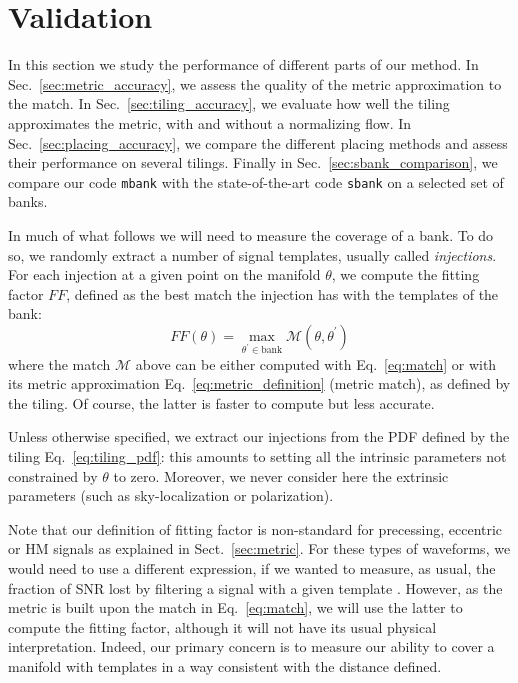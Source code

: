 \documentclass[twocolumn,showpacs,preprintnumbers,nofootinbib,prd,
superscriptaddress,10pt]{revtex4-2}
\begin{document}
\section{Validation} \label{sec:validation}

In this section we study the performance of different parts of our method. In Sec.~\ref{sec:metric_accuracy}, we assess the quality of the metric approximation to the match. In Sec.~\ref{sec:tiling_accuracy}, we evaluate how well the tiling approximates the metric, with and without a normalizing flow.
In Sec.~\ref{sec:placing_accuracy}, we compare the different placing methods and assess their performance on several tilings.
Finally in Sec.~\ref{sec:sbank_comparison}, we compare our code \texttt{mbank} with the state-of-the-art code \texttt{sbank} \cite{Ajith:2012mn} on a selected set of banks.

In much of what follows we will need to measure the coverage of a bank. To do so, we randomly extract a number of signal templates, usually called {\it injections}.
For each injection at a given point on the manifold $\theta$, we compute the fitting factor $FF$, defined as the best match the injection has with the templates of the bank:
\begin{equation}\label{eq:FF}
	FF(\theta) = \max_{\theta^\prime \in \text{bank}} \mathcal{M}(\theta, \theta^\prime)
\end{equation}
where the match $\mathcal{M}$ above can be either computed with Eq.~\eqref{eq:match} or with its metric approximation Eq.~\eqref{eq:metric_definition} (metric match), as defined by the tiling.
Of course, the latter is faster to compute but less accurate.

Unless otherwise specified, we extract our injections from the PDF defined by the tiling Eq.~\eqref{eq:tiling_pdf}: this amounts to setting all the intrinsic parameters not constrained by $\theta$ to zero.
Moreover, we never consider here the extrinsic parameters (such as sky-localization or polarization).

Note that our definition of fitting factor is non-standard for precessing, eccentric or HM signals as explained in Sect.~\ref{sec:metric}. For these types of waveforms, we would need to use a different expression, if we wanted to measure, as usual, the fraction of SNR lost by filtering a signal with a given template \cite{Harry:2017weg}. However, as the metric is built upon the match in Eq.~\eqref{eq:match}, we will use the latter to compute the fitting factor, although it will not have its usual physical interpretation. Indeed, our primary concern is to measure our ability to cover a manifold with templates in a way consistent with the distance defined.
\end{document}
